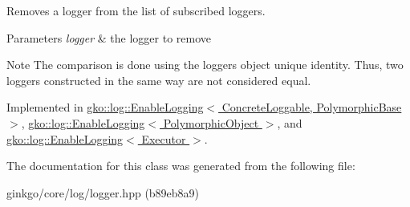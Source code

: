 Removes a logger from the list of subscribed loggers. 


\begin{DoxyParams}{Parameters}
{\em logger} & the logger to remove\\
\hline
\end{DoxyParams}
\begin{DoxyNote}{Note}
The comparison is done using the logger\textquotesingle{}s object unique identity. Thus, two loggers constructed in the same way are not considered equal. 
\end{DoxyNote}


Implemented in \hyperlink{classgko_1_1log_1_1EnableLogging_aba5317f8a03956a61d770e9b07fc65cc}{gko\+::log\+::\+Enable\+Logging$<$ Concrete\+Loggable, Polymorphic\+Base $>$}, \hyperlink{classgko_1_1log_1_1EnableLogging_aba5317f8a03956a61d770e9b07fc65cc}{gko\+::log\+::\+Enable\+Logging$<$ Polymorphic\+Object $>$}, and \hyperlink{classgko_1_1log_1_1EnableLogging_aba5317f8a03956a61d770e9b07fc65cc}{gko\+::log\+::\+Enable\+Logging$<$ Executor $>$}.



The documentation for this class was generated from the following file\+:\begin{DoxyCompactItemize}
\item 
ginkgo/core/log/logger.\+hpp (b89eb8a9)\end{DoxyCompactItemize}
